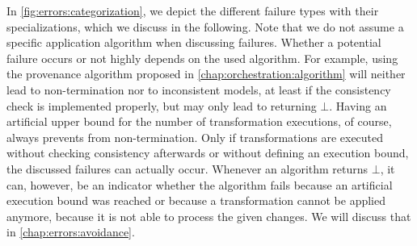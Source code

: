 In \autoref{fig:errors:categorization}, we depict the different failure types with their specializations, which we discuss in the following.
Note that we do not assume a specific application algorithm when discussing failures.
Whether a potential failure occurs or not highly depends on the used algorithm.
For example, using the provenance algorithm proposed in \autoref{chap:orchestration:algorithm} will neither lead to non-termination nor to inconsistent models, at least if the consistency check is implemented properly, but may only lead to returning $\bot$.
Having an artificial upper bound for the number of transformation executions, of course, always prevents from non-termination.
Only if transformations are executed without checking consistency afterwards or without defining an execution bound, the discussed failures can actually occur.
Whenever an algorithm returns $\bot$, it can, however, be an indicator whether the algorithm fails because an artificial execution bound was reached or because a transformation cannot be applied anymore, because it is not able to process the given changes.
We will discuss that in \autoref{chap:errors:avoidance}.


